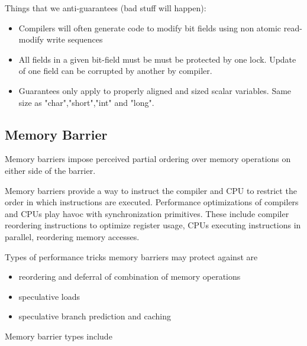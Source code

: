 \documentclass{article}
\begin{document}
Things that we anti-guarantees (bad stuff will happen):

\begin{itemize}

\item Compilers will often generate code to modify bit fields using non
  atomic read-modify write sequences

\item All fields in a given bit-field must be must be protected by one
  lock. Update of one field can be corrupted by another by compiler.
  
\item Guarantees only apply to properly aligned and sized scalar
  variables. Same size as "char","short","int" and "long".  
\end{itemize}



\subsection{Memory Barrier}

Memory barriers impose perceived partial ordering over memory
operations on either side of the barrier.

Memory barriers provide a way to instruct the compiler and CPU to
restrict the order in which instructions are executed. Performance
optimizations of compilers and CPUs play havoc with synchronization
primitives. These include compiler reordering instructions to optimize
register usage, CPUs executing instructions in parallel, reordering
memory accesses.


Types of performance tricks memory barriers may protect against are
\begin{itemize}
\item reordering and deferral of combination of memory operations
\item speculative loads
\item speculative branch prediction and caching
\end{itemize}

Memory barrier types include
\end{document}
